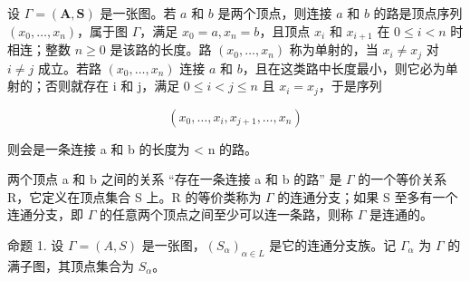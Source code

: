 
设 \(\Gamma = (\mathbf{A},\mathbf{S})\) 是一张图。若 \(a\) 和 \(b\) 是两个顶点，则连接 \(a\) 和 \(b\) 的路是顶点序列 \((x_0,\ldots ,x_n)\)，属于图 \(\Gamma\)，满足 \(x_0 = a,x_n = b\)，且顶点 \(x_{i}\) 和 \(x_{i + 1}\) 在 \(0\leqslant i < n\) 时相连；整数 \(n\geqslant 0\) 是该路的长度。路 \((x_0,\ldots ,x_n)\) 称为单射的，当 \(x_{i}\neq x_{j}\) 对 \(i\neq j\) 成立。若路 \((x_0,\ldots ,x_n)\) 连接 \(a\) 和 \(b\)，且在这类路中长度最小，则它必为单射的；否则就存在 i 和 j，满足 \(0 \leqslant i < j \leqslant n\) 且 \(x_{i} = x_{j}\)，于是序列

\[
\left(x _ {0}, \dots , x _ {i}, x _ {j + 1}, \dots , x _ {n}\right)
\]

则会是一条连接 a 和 b 的长度为 \textless{} n 的路。

两个顶点 a 和 b 之间的关系 ``存在一条连接 a 和 b 的路'' 是 \(\Gamma\) 的一个等价关系 R，它定义在顶点集合 S 上。R 的等价类称为 \(\Gamma\) 的连通分支；如果 S 至多有一个连通分支，即 \(\Gamma\) 的任意两个顶点之间至少可以连一条路，则称 \(\Gamma\) 是连通的。

命题 1. 设 \(\Gamma = (A, S)\) 是一张图，\((S_{\alpha})_{\alpha \in L}\) 是它的连通分支族。记 \(\Gamma_{\alpha}\) 为 \(\Gamma\) 的满子图，其顶点集合为 \(S_{\alpha}\)。

